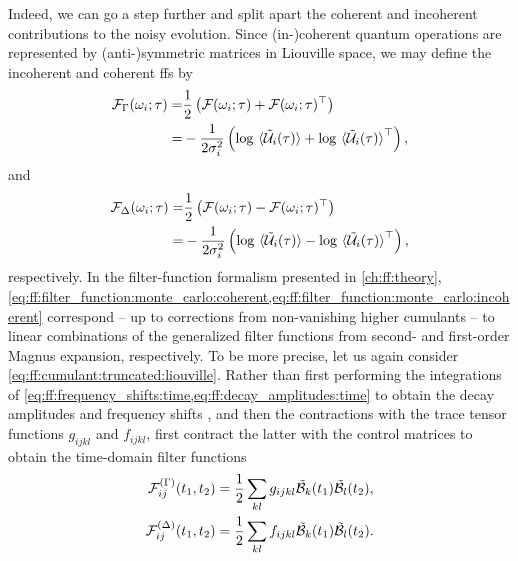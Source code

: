 Indeed, we can go a step further and split apart the coherent and incoherent contributions to the noisy evolution.
Since (in-)coherent quantum operations are represented by (anti-)symmetric matrices in Liouville space, we may define the incoherent and coherent \glspl{ff} by
\begin{equation}\label{eq:ff:filter_function:monte_carlo:incoherent}
    \begin{split}
        \mc{F}_\decayamps(\omega_i;\tau) =& \frac{1}{2}\left(\mc{F}(\omega_i;\tau) + \mc{F}(\omega_i;\tau)\transpose\right) \\
                                         =& -\frac{1}{2\sigma_i^2}\left(\log\ev*{\liouvUe_i(\tau)} + \log\ev*{\liouvUe_i(\tau)}\transpose\right),
    \end{split}
\end{equation}
and
\begin{equation}\label{eq:ff:filter_function:monte_carlo:coherent}
    \begin{split}
        \mc{F}_\freqshifts(\omega_i;\tau) =& \frac{1}{2}\left(\mc{F}(\omega_i;\tau) - \mc{F}(\omega_i;\tau)\transpose\right) \\
                                          =& -\frac{1}{2\sigma_i^2}\left(\log\ev*{\liouvUe_i(\tau)} - \log\ev*{\liouvUe_i(\tau)}\transpose\right),
    \end{split}
\end{equation}
respectively.
In the filter-function formalism presented in \cref{ch:ff:theory}, \cref{eq:ff:filter_function:monte_carlo:coherent,eq:ff:filter_function:monte_carlo:incoherent} correspond -- up to corrections from non-vanishing higher cumulants -- to linear combinations of the generalized filter functions from second- and first-order Magnus expansion, respectively.
To be more precise, let us again consider \cref{eq:ff:cumulant:truncated:liouville}.
Rather than first performing the integrations of \cref{eq:ff:frequency_shifts:time,eq:ff:decay_amplitudes:time} to obtain the decay amplitudes \decayamps and frequency shifts \freqshifts, and then the contractions with the trace tensor functions $g_{ijkl}$ and $f_{ijkl}$, first contract the latter with the control matrices to obtain the time-domain filter functions
\begin{align}
    \mathcal{F}^{(\Gamma)}_{ij}(t_1, t_2) &= \frac{1}{2}\sum_{kl} g_{ijkl}\tilde{\mathcal{B}}_{k}(t_1)\tilde{\mathcal{B}}_{l}(t_2), \label{eq:ff:filter_function:cumulant:incoherent}\\
    \mathcal{F}^{(\Delta)}_{ij}(t_1, t_2) &= \frac{1}{2}\sum_{kl} f_{ijkl}\tilde{\mathcal{B}}_{k}(t_1)\tilde{\mathcal{B}}_{l}(t_2). \label{eq:ff:filter_function:cumulant:coherent}
\end{align}
